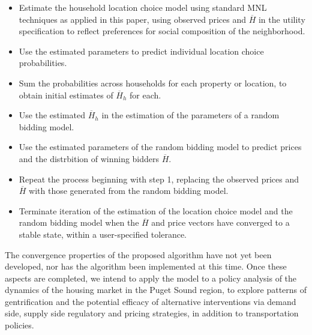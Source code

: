 \documentclass{article}
\begin{document}
\begin{itemize}

\item Estimate the household location choice model using standard MNL techniques as applied in this paper, using observed prices and $\overline{H}$
in the utility specification to reflect preferences for social composition of the neighborhood.
\item Use the estimated parameters to predict individual location choice probabilities.
\item Sum the probabilities across households for each property or location, to obtain initial estimates of $\overline{H}_{h}$ for each.
\item Use the estimated $\overline{H}_{h}$ in the estimation of the parameters of a random bidding model.
\item Use the estimated parameters of the random bidding model to predict prices and the distrbition of winning bidders $\overline{H}$.
\item Repeat the process beginning with step 1, replacing the observed prices and $\overline{H}$ with those generated from the random bidding model.
\item Terminate iteration of the estimation of the location choice model and the random bidding model when the $\overline{H}$ and price vectors have
converged to a stable state, within a user-specified tolerance.

\end{itemize}

The convergence properties of the proposed algorithm have not yet been developed, nor has the algorithm been implemented at this time.
Once these aspects are completed, we intend to apply the model to a policy analysis of the dynamics of the housing market in the Puget Sound
region, to explore patterns of gentrification and the potential efficacy of alternative interventions via demand side, supply side regulatory
 and pricing strategies, in addition to transportation policies.




\end{document}

